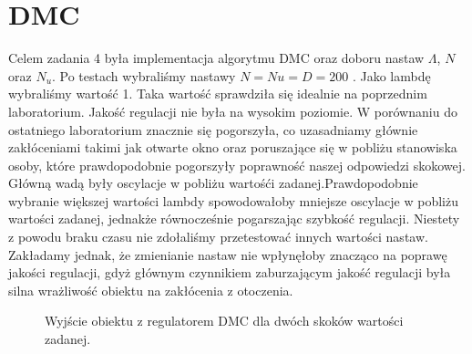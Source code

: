 \chapter{DMC}
Celem zadania 4 była implementacja algorytmu DMC oraz doboru nastaw $\Lambda$, $N$ oraz $N_u$. Po testach wybraliśmy nastawy $N=Nu=D=200$ . Jako lambdę wybraliśmy wartość 1. Taka wartość sprawdziła się idealnie
na poprzednim laboratorium. Jakość regulacji nie była na wysokim poziomie. W porównaniu do ostatniego laboratorium znacznie się pogorszyła, co uzasadniamy głównie zakłóceniami takimi jak
otwarte okno oraz poruszające się w pobliżu stanowiska osoby, które prawdopodobnie
pogorszyły poprawność naszej odpowiedzi skokowej. Główną wadą były oscylacje w pobliżu wartośći zadanej.Prawdopodobnie wybranie większej wartości lambdy spowodowałoby mniejsze oscylacje w pobliżu wartości zadanej,
jednakże równocześnie pogarszając szybkość regulacji. Niestety z powodu braku czasu nie zdołaliśmy przetestować innych wartości nastaw. Zakładamy jednak, że zmienianie nastaw nie wpłynęłoby
znacząco na poprawę jakości regulacji, gdyż głównym czynnikiem zaburzającym jakość regulacji była silna wrażliwość obiektu na zakłócenia z otoczenia.

\begin{figure}[tb]
\centering
{}
\caption{Wyjście obiektu z regulatorem DMC dla dwóch skoków wartości zadanej.}
\label{fig:bez_zakl}
\end{figure}
